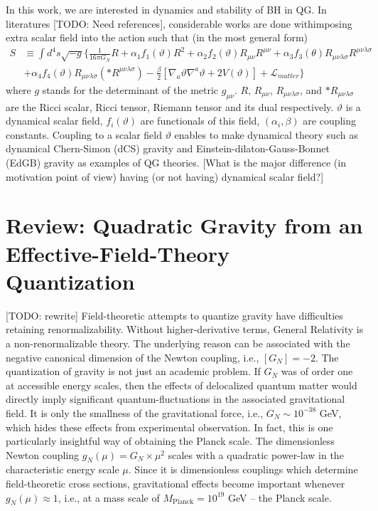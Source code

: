 \documentclass[a4paper,oneside,openany,11pt]{memoir}
\numberwithin{equation}{section} %
\newcommand{\TODO}[1]{{\color{red}[}{\color{red}TODO:} {\color{blue}#1}{\color{red}]}}
\newcommand{\NOTE}[1]{{\color{blue}[#1]}}
\begin{document}
In this work, we are interested in dynamics and stability of BH in QG.
In literatures \TODO{Need references}, considerable works are done withimposing extra 
scalar field into the action such that (in the most general form)
\begin{align}
S &\equiv \int d^4 s \sqrt{-g} \Bigg\{ \frac{1}{16 \pi G_N} R + \alpha_1 f_1 (\vartheta) R^2 + \alpha_2 f_2 (\vartheta) R_{\mu \nu} R^{\mu \nu} 
    + \alpha_3 f_3 (\theta) R_{\mu \nu \lambda \sigma} R^{\mu \nu \lambda \sigma} \nonumber \\
    &+ \alpha_4 f_4 (\vartheta) R_{\mu \nu \lambda \sigma} (*R^{\mu \nu \lambda \sigma}) - \frac{\beta}{2} [ \nabla_a \vartheta \nabla^a \vartheta
    + 2 V(\vartheta) ] + \mathcal{L}_{matter} \Bigg\}
\end{align}
where $g$ stands for the determinant of the metric $g_{\mu \nu}$. $R, \, R_{\mu \nu}, \, R_{\mu \nu \lambda \sigma}$, 
and $*R_{\mu \nu \lambda \sigma}$ are the Ricci scalar, Ricci tensor, Riemann tensor and its dual respectively. 
$\vartheta$ is a dynamical scalar field, $f_i (\vartheta)$ are functionals of this field, $(\alpha_i , \beta)$ are coupling constants.
Coupling to a scalar field $\vartheta$ enables to make dynamical theory such as dynamical Chern-Simon (dCS) gravity 
and Einstein-dilaton-Gauss-Bonnet (EdGB) gravity as examples of QG theories.
\NOTE{What is the major difference (in motivation point of view) having (or not having) dynamical scalar field?}







\section{Review: Quadratic Gravity from an Effective-Field-Theory Quantization}
\label{sec:EFT}
\TODO{rewrite}
Field-theoretic attempts to quantize gravity have difficulties retaining renormalizability. Without higher-derivative terms, General Relativity is a non-renormalizable theory. The underlying reason can be associated with the negative canonical dimension of the Newton coupling, i.e., $[G_N]=-2$. The quantization of gravity is not just an academic problem. If $G_N$ was of order one at accessible energy scales, then the effects of delocalized quantum matter would directly imply significant quantum-fluctuations in the associated gravitational field. It is only the smallness of the gravitational force, i.e., $G_N\sim 10^{-38}$ GeV, which hides these effects from experimental observation. In fact, this is one particularly insightful way of obtaining the Planck scale. The dimensionless Newton coupling $g_N(\mu) = G_N\times \mu^2$ scales with a quadratic power-law in the characteristic energy scale $\mu$. Since it is dimensionless couplings which determine field-theoretic cross sections, gravitational effects become important whenever $g_N(\mu)\approx 1$, i.e., at a mass scale of $M_\text{Planck} = 10^{19}$ GeV -- the Planck scale.
\\
\end{document}
